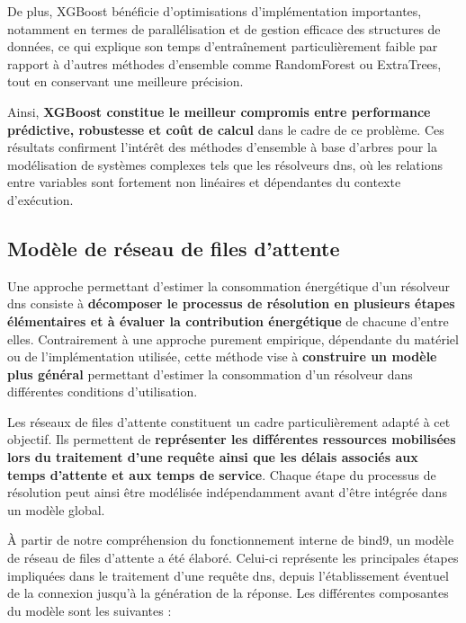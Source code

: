 \documentclass[12pt, a4paper]{report}
\begin{document}
	De plus, XGBoost bénéficie d'optimisations d'implémentation importantes, notamment en termes de parallélisation et de gestion efficace des structures de données, ce qui explique son temps d'entraînement particulièrement faible par rapport à d'autres méthodes d'ensemble comme RandomForest ou ExtraTrees, tout en conservant une meilleure précision.

	Ainsi, \textbf{XGBoost constitue le meilleur compromis entre performance prédictive, robustesse et coût de calcul} dans le cadre de ce problème. Ces résultats confirment l'intérêt des méthodes d'ensemble à base d'arbres pour la modélisation de systèmes complexes tels que les résolveurs \gls{dns}, où les relations entre variables sont fortement non linéaires et dépendantes du contexte d'exécution.


	\subsection{Modèle de réseau de files d'attente}
	
	Une approche permettant d'estimer la consommation énergétique d'un résolveur \gls{dns} consiste à \textbf{décomposer le processus de résolution en plusieurs étapes élémentaires et à évaluer la contribution énergétique} de chacune d'entre elles. Contrairement à une approche purement empirique, dépendante du matériel ou de l'implémentation utilisée, cette méthode vise à \textbf{construire un modèle plus général} permettant d'estimer la consommation d'un résolveur dans différentes conditions d'utilisation.
	
	Les réseaux de files d'attente constituent un cadre particulièrement adapté à cet objectif. Ils permettent de \textbf{représenter les différentes ressources mobilisées lors du traitement d'une requête ainsi que les délais associés aux temps d'attente et aux temps de service}. Chaque étape du processus de résolution peut ainsi être modélisée indépendamment avant d'être intégrée dans un modèle global.

	À partir de notre compréhension du fonctionnement interne de \gls{bind9}, un modèle de réseau de files d'attente a été élaboré. Celui-ci représente les principales étapes impliquées dans le traitement d'une requête \gls{dns}, depuis l'établissement éventuel de la connexion jusqu'à la génération de la réponse. Les différentes composantes du modèle sont les suivantes :
\end{document}
